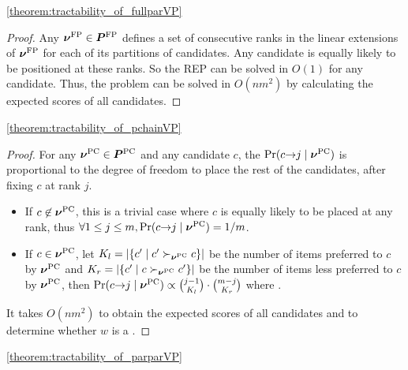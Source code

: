 \begin{reptheorem}{\ref{theorem:tractability_of_fullparVP}}
  \theoremTractabilityOfFP
\end{reptheorem}

\begin{proof}
    Any $\bm{\nu}^{\text{FP}} \in \bm{P}^{\text{FP}}$ defines a set of consecutive ranks in the linear extensions of $\bm{\nu}^{\text{FP}}$ for each of its partitions of candidates.
    Any candidate is equally likely to be positioned at these ranks.
    So the REP can be solved in $O(1)$ for any candidate.
    Thus, the \mew problem can be solved in $O(nm^2)$ by calculating the expected scores of all candidates.
\end{proof}

\begin{reptheorem}{\ref{theorem:tractability_of_pchainVP}}
  \theoremTractabilityOfPC
\end{reptheorem}

\begin{proof}
  For any $\bm{\nu}^{\text{PC}} \in \bm{P}^{\text{PC}}$ and any candidate $c$, the $\Pr(c {\rightarrow} j \mid \bm{\nu}^{\text{PC}})$ is proportional to the degree of freedom to place the rest of the candidates, after fixing $c$ at rank $j$.
  \begin{itemize}
     \item If $c \not\in \bm{\nu}^{\text{PC}}$, this is a trivial case where $c$ is equally likely to be placed at any rank, thus $\forall 1 \leq j \leq m, \Pr(c {\rightarrow} j \mid \bm{\nu}^{\text{PC}}) = 1/m$.
    \item If $c \in \bm{\nu}^{\text{PC}}$, let $K_l = |\{ c' \mid c' \succ_{\bm{\nu}^{\text{PC}}} c \}|$ be the number of items preferred to $c$ by $\bm{\nu}^{\text{PC}}$ and $K_r = |\{ c' \mid c \succ_{\bm{\nu}^{\text{PC}}} c' \}|$ be the number of items less preferred to $c$ by $\bm{\nu}^{\text{PC}}$, then $\Pr(c {\rightarrow} j \mid \bm{\nu}^{\text{PC}}) \propto \binom{j-1}{K_l} \cdot \binom{m - j}{K_r}$ where .
  \end{itemize}

  It takes $O(nm^2)$ to obtain the expected scores of all candidates and to determine whether $w$ is a \mew.
\end{proof}

\begin{reptheorem}{\ref{theorem:tractability_of_parparVP}}
  \theoremTractabilityOfPP
\end{reptheorem}

